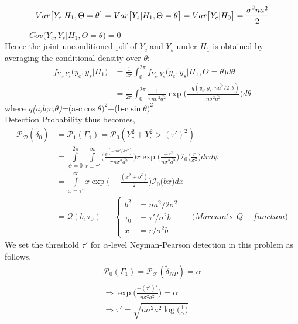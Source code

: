 \documentclass[a4paper,english,12pt]{article}
\begin{document}
\begin{equation*}
Var\big[Y_c|H_1, \Theta=\theta\big]=
Var\big[Y_s|H_1, \Theta=\theta\big] \\
=Var\big[Y_c|H_0\big] \\
=\frac{\sigma^2n\bar{a^2}}{2} \\
\end{equation*}
\ \ \ \ \  \ $Cov\big(Y_c,Y_s|H_1, \Theta=\theta\big)=0$ \\
Hence the joint unconditioned pdf of $Y_c$ and $Y_s$ under $H_1$ is obtained by averaging the conditional density over $\theta$:
\begin{equation*}
\begin{aligned}
f_{Y_c,Y_s}\big(y_c,y_s|H_1\big)
&=\frac{1}{2\pi} \int_0^{2\pi}f_{Y_c,Y_s}\big(y_c,y_s|H_1, \Theta=\theta\big) d\theta \\
&=\frac{1} {2\pi} \int_0^{2\pi} \frac{1}{\pi n\sigma^2\bar{a^2}} \exp\bigg(\frac{ -q(y_c,y_s;n\bar{a^2}/2,\theta)}{n\sigma^2\bar{a^2}}\bigg) d\theta
\end{aligned}
\end{equation*}
where \textit{q(a,b;c,$\theta$)}=(a-c$\cos\theta)^2$+(b-c$\sin\theta)^2$ \\
Detection Probability thus becomes,
\begin{equation*}
\begin{aligned}
\mathcal{P_D}(\tilde{\delta}_{0}) 
&=\mathcal{P}_1(\Gamma_1)   
= \mathcal{P}_0(Y_c^2+Y_s^2>(\tau')^2) \\
&= \int\limits_{\psi=0}^{2\pi}\int \limits_{r=\tau'}^{\infty}\bigg(\frac{e^{(-n\bar{a^2}/4\sigma^2)}}{\pi n\sigma^2\bar{a^2}}\bigg) r  \exp\bigg(\frac{ -r^2}{n\sigma^2\bar{a^2}}\bigg) \mathcal{I}_0\bigg(\frac{r}{\sigma^2}\bigg)dr d\psi  \\
&=\int \limits_{x=\tau'}^{\infty}x\exp\bigg(-\frac{(x^2+b^2)}{2}\bigg)\mathcal{I}_0\big(bx\big) dx \\
&=\mathcal{Q}(b,\tau_0) \ \ \ \ \ \ \ 
\begin{cases}
b^2 &=n\bar{a^2}/2\sigma^2\\
\tau_0 &= \tau'/ \sigma^2b\\
x  &=  r/\sigma^2b
\end{cases} \ \ \ \ \ \ \bigg(Marcum's \ \ Q-function\bigg)
\end{aligned}
\end{equation*}
We set the threshold $\tau'$ for $\alpha$-level  Neyman-Pearson detection in this problem  as follows. 
\begin{equation*}
\begin{aligned}
\mathcal{P}_0(\Gamma_1)  =  \mathcal{P_F}(\tilde{\delta}_{NP})  =  \alpha \\
\Rightarrow  \exp\bigg(\frac{ -(\tau')^2}{n\sigma^2\bar{a^2}}\bigg)=\alpha \\
\Rightarrow
\tau'= \sqrt{n\sigma^2\bar{a^2}\log\bigg(\frac{1}{\alpha}\bigg)} 
\end{aligned}
\end{equation*}
\end{document}

